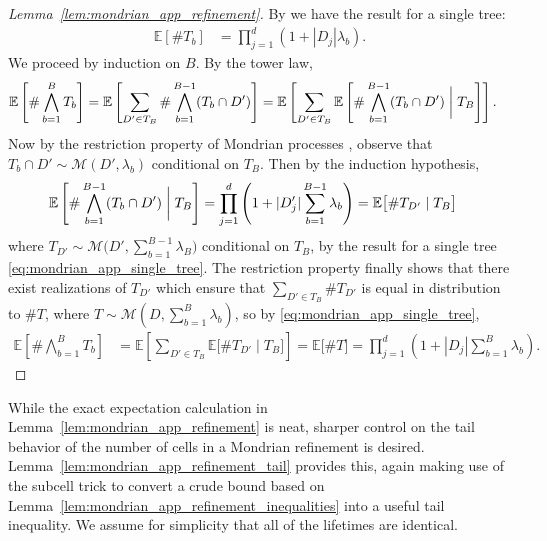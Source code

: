 \documentclass[11pt,lof]{puthesis}
\newcommand{\E}{\ensuremath{\mathbb{E}}}
\newcommand{\cM}{\ensuremath{\mathcal{M}}}
\theoremstyle{break}
\theoremstyle{proof}
\newtheorem{proof}{Proof}
\begin{document}
\begin{proof}[Lemma~\ref{lem:mondrian_app_refinement}]

  By \citet[Proposition~2]{mourtada2020minimax}
  we have the result for a single tree:
  \begin{align}
    \label{eq:mondrian_app_single_tree}
    \E\left[\# T_b \right]
    &= \prod_{j=1}^d \left(
      1 + |D_j| \lambda_b
    \right).
  \end{align}
  We proceed by induction on $B$.
  By the tower law,
  \begin{align*}
    \E\left[\# \bigwedge_{b=1}^B T_b \right]
    &=
    \E\left[
      \sum_{D' \in T_B}
      \#
      \bigwedge_{b=1}^{B-1} (T_b \cap D')
    \right]
    = \E\left[
      \sum_{D' \in T_B}
      \E\left[
        \#
        \bigwedge_{b=1}^{B-1} (T_b \cap D')
        \biggm| T_B
      \right]
    \right].
  \end{align*}
  Now by the restriction property of Mondrian processes
  \citep[Fact~2]{mourtada2020minimax},
  observe that $T_b \cap D' \sim \cM(D', \lambda_b)$
  conditional on $T_B$.
  Then by the induction hypothesis,
  \begin{align*}
    \E\left[
      \#
      \bigwedge_{b=1}^{B-1} (T_b \cap D')
      \biggm| T_B
    \right]
    &=
    \prod_{j=1}^d \left(
      1 + |D'_j| \sum_{b=1}^{B-1} \lambda_b
    \right)
    = \E\big[
      \# T_{D'} \mid T_B
    \big]
  \end{align*}
  where $T_{D'} \sim \cM\big(D', \sum_{b=1}^{B-1} \lambda_B\big)$
  conditional on $T_B$,
  by the result for a single tree \eqref{eq:mondrian_app_single_tree}.
  The restriction property finally shows that there exist realizations
  of $T_{D'}$ which ensure that
  $\sum_{D' \in T_B} \# T_{D'}$ is equal in distribution
  to $\# T$, where $T \sim \cM(D, \sum_{b=1}^B \lambda_b)$,
  so by \eqref{eq:mondrian_app_single_tree},
  \begin{align*}
    \E\left[\# \bigwedge_{b=1}^B T_b \right]
    &=
    \E\left[
      \sum_{D' \in T_B}
      \E\big[
        \# T_{D'} \mid T_B
      \big]
    \right]
    =
    \E\big[\# T \big]
    = \prod_{j=1}^d \left(
      1 + |D_j| \sum_{b=1}^B \lambda_b
    \right).
  \end{align*}
\end{proof}

While the exact expectation calculation in
Lemma~\ref{lem:mondrian_app_refinement} is neat,
sharper control on the tail
behavior of the number of cells in a Mondrian refinement is desired.
Lemma~\ref{lem:mondrian_app_refinement_tail} provides this, again
making use of the subcell trick to convert a crude bound based on
Lemma~\ref{lem:mondrian_app_refinement_inequalities} into a useful tail
inequality.
We assume for simplicity that all of the lifetimes are identical.
\end{document}

